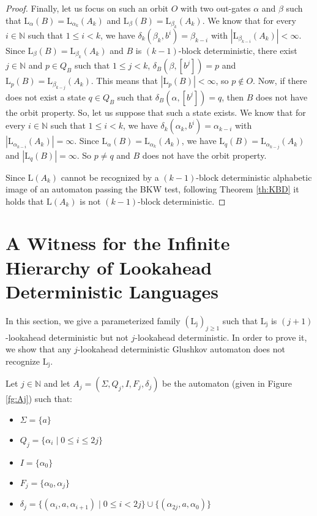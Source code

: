 \documentclass{llncs}
\begin{document}
\begin{proof}
	Finally, let us focus on such an orbit $O$ with two out-gates $\alpha$ and $\beta$ such that $\mathrm{L}_{\alpha}(B) = \mathrm{L}_{\alpha_k}(A_k)$ and $\mathrm{L}_{\beta}(B) = \mathrm{L}_{\beta_k}(A_k)$.
	We know that for every $i \in \mathbb{N}$ such that $1 \leq i < k$, we have $\delta_k(\beta_k, b^i) = \beta_{k-i}$ with $|\mathrm{L}_{\beta_{k-i}}(A_k)| < \infty$.
	Since $\mathrm{L}_{\beta}(B) = \mathrm{L}_{\beta_k}(A_k)$ and $B$ is $(k-1)$-block deterministic, there exist $j \in \mathbb{N}$ and $p \in Q_B$ such that $1 \leq j < k$, $\delta_B(\beta, [b^j]) = p$ and $\mathrm{L}_p(B) = \mathrm{L}_{\beta_{k-j}}(A_k)$.
	This means that $|\mathrm{L}_p(B)| < \infty$, so $p \notin O$.
	Now, if there does not exist a state $q \in Q_B$ such that $\delta_B(\alpha, [b^j]) = q$, then $B$ does not have the orbit property.
	So, let us suppose that such a state exists.
	We know that for every $i \in \mathbb{N}$ such that $1 \leq i < k$, we have $\delta_k(\alpha_k, b^i) = \alpha_{k-i}$ with $|\mathrm{L}_{\alpha_{k-i}}(A_k)| = \infty$.
	Since $\mathrm{L}_{\alpha}(B) = \mathrm{L}_{\alpha_k}(A_k)$, we have $\mathrm{L}_q(B) = \mathrm{L}_{\alpha_{k-j}}(A_k)$ and $|\mathrm{L}_q(B)| = \infty$.
	So $p \neq q$ and $B$ does not have the orbit property.
	
	Since $\mathrm{L}(A_k)$ cannot be recognized by a $(k-1)$-block deterministic alphabetic image of an automaton passing the BKW test, following Theorem \ref{th:KBD} it holds that $\mathrm{L}(A_k)$ is not $(k-1)$-block deterministic.
\end{proof}


\section{A Witness for the Infinite Hierarchy of Lookahead Deterministic Languages}\label{se:kld_witness}

	In this section, we give a parameterized family $(\mathrm{L_j})_{j \geq 1}$ such that $\mathrm{L_j}$ is $(j+1)$-lookahead deterministic but not $j$-lookahead deterministic.
	In order to prove it, we show that any $j$-lookahead deterministic Glushkov automaton does not recognize $\mathrm{L_j}$.

	Let $j \in \mathbb{N}$ and let $A_j = (\Sigma, Q_j, I, F_j, \delta_j)$ be the automaton (given in Figure \ref{fg:Aj}) such that:
	\begin{itemize}
		\item $\Sigma = \{a\}$
		\item $Q_j = \{\alpha_i \mid 0 \leq i \leq 2j\}$
		\item $I = \{\alpha_0\}$
		\item $F_j = \{\alpha_0, \alpha_j\}$
		\item $\delta_j = \{(\alpha_i, a, \alpha_{i+1}) \mid 0 \leq i < 2j\} \cup \{(\alpha_{2j}, a, \alpha_0)\}$
	\end{itemize}
\end{document}

